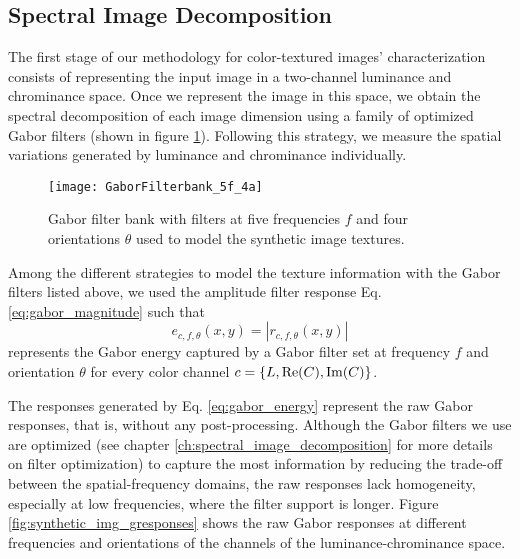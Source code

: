 \subsection{Spectral Image Decomposition}
The first stage of our methodology for color-textured images' characterization consists of representing the input image in a two-channel luminance and chrominance space. Once we represent the image in this space, we obtain the spectral decomposition of each image dimension using a family of optimized Gabor filters (shown in figure \ref{fig:gabrfilter_5f_4a}). Following this strategy, we measure the spatial variations generated by luminance and chrominance individually. 

\begin{figure}[!ht]
    \centering
    \texttt{[image: GaborFilterbank\_5f\_4a]}
    \caption{Gabor filter bank with filters at five frequencies $f$ and four orientations $\theta$ used to model the synthetic image textures.}\label{fig:gabrfilter_5f_4a}    
\end{figure}

Among the different strategies to model the texture information with the Gabor filters listed above, we used the amplitude filter response Eq. \eqref{eq:gabor_magnitude} such that
\begin{equation}\label{eq:gabor_energy}
	e_{c, f, \theta}(x,y) = |r_{c, f, \theta}(x,y)|
\end{equation}
represents the Gabor energy captured by a Gabor filter set at frequency $f$ and orientation $\theta$ for every color channel  $c=\{L, \mathrm{Re}(C), \mathrm{Im}(C)\}$. 

The responses generated by Eq. \eqref{eq:gabor_energy} represent the raw Gabor responses, that is, without any post-processing. Although the Gabor filters we use are optimized (see chapter \ref{ch:spectral_image_decomposition} for more details on filter optimization) to capture the most information by reducing the trade-off between the spatial-frequency domains, the raw responses lack homogeneity, especially at low frequencies, where the filter support is longer. Figure \ref{fig:synthetic_img_gresponses} shows the raw Gabor responses at different frequencies and orientations of the channels of the luminance-chrominance space. 

